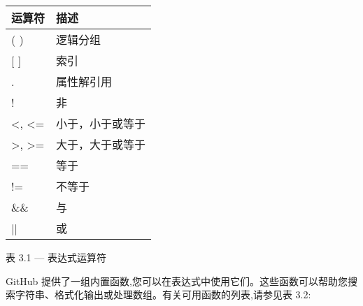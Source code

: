 \begin{longtable}[c]{|l|l|}
\hline
\textbf{运算符}              & \textbf{描述}                   \\ \hline
\endfirsthead
%
\endhead
%
( )                            & 逻辑分组                       \\ \hline
{[} {]}                        & 索引                                  \\ \hline
.                              & 属性解引用                  \\ \hline
!                              & 非                                    \\ \hline
\textless , \textless{}=       & 小于，小于或等于      \\ \hline
\textgreater , \textgreater{}= & 大于，大于或等于 \\ \hline
==                             & 等于                                  \\ \hline
!=                             & 不等于                              \\ \hline
\&\&                           & 与                                    \\ \hline
||                             & 或                                     \\ \hline
\end{longtable}

\begin{center}
表 3.1  ---  表达式运算符
\end{center}

GitHub 提供了一组内置函数,您可以在表达式中使用它们。这些函数可以帮助您搜索字符串、格式化输出或处理数组。有关可用函数的列表,请参见表 3.2:


